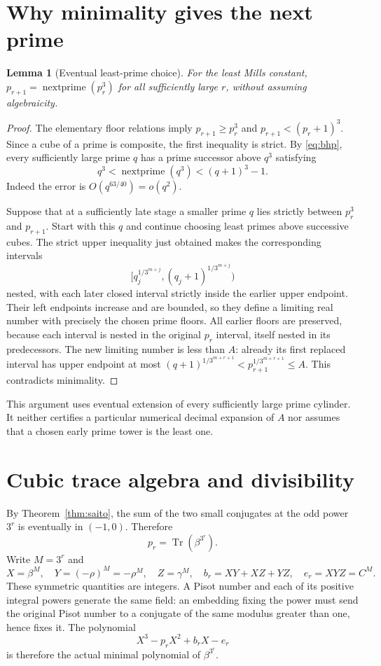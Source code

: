 \documentclass[11pt,a4paper]{article}
\newtheorem{lemma}[theorem]{Lemma}
\theoremstyle{definition}\newtheorem{definition}[theorem]{Definition}
\theoremstyle{remark}\newtheorem{remark}[theorem]{Remark}
\DeclareMathOperator{\Tr}{Tr}\DeclareMathOperator{\Norm}{N}\DeclareMathOperator{\trdeg}{trdeg}\DeclareMathOperator{\ord}{ord}\DeclareMathOperator{\lcm}{lcm}
\begin{document}
\section{Why minimality gives the next prime}
\begin{lemma}[Eventual least-prime choice]\label{lem:least}
For the least Mills constant, $p_{r+1}=\operatorname{nextprime}(p_r^3)$ for all sufficiently large $r$, without assuming algebraicity.
\end{lemma}
\begin{proof}
The elementary floor relations imply $p_{r+1}\ge p_r^3$ and $p_{r+1}<(p_r+1)^3$. Since a cube of a prime is composite, the first inequality is strict. By \eqref{eq:bhp}, every sufficiently large prime $q$ has a prime successor above $q^3$ satisfying
\[
 q^3<\operatorname{nextprime}(q^3)<(q+1)^3-1.
\]
Indeed the error is $O(q^{63/40})=o(q^2)$.

Suppose that at a sufficiently late stage a smaller prime $q$ lies strictly between $p_r^3$ and $p_{r+1}$. Start with this $q$ and continue choosing least primes above successive cubes. The strict upper inequality just obtained makes the corresponding intervals
\[
 [q_j^{1/3^{m+j}},(q_j+1)^{1/3^{m+j}})
\]
nested, with each later closed interval strictly inside the earlier upper endpoint. Their left endpoints increase and are bounded, so they define a limiting real number with precisely the chosen prime floors. All earlier floors are preserved, because each interval is nested in the original $p_r$ interval, itself nested in its predecessors. The new limiting number is less than $A$: already its first replaced interval has upper endpoint at most $(q+1)^{1/3^{m+r+1}}<p_{r+1}^{1/3^{m+r+1}}\le A$. This contradicts minimality.
\end{proof}
This argument uses eventual extension of every sufficiently large prime cylinder. It neither certifies a particular numerical decimal expansion of $A$ nor assumes that a chosen early prime tower is the least one.

\section{Cubic trace algebra and divisibility}
By Theorem~\ref{thm:saito}, the sum of the two small conjugates at the odd power $3^r$ is eventually in $(-1,0)$. Therefore
\[
 p_r=\Tr(\beta^{3^r}).
\]
Write $M=3^r$ and
\[
 X=\beta^M,\quad Y=(-\rho)^M=-\rho^M,\quad Z=\gamma^M,
 \quad b_r=XY+XZ+YZ,\quad e_r=XYZ=C^M.
\]
These symmetric quantities are integers. A Pisot number and each of its positive integral powers generate the same field: an embedding fixing the power must send the original Pisot number to a conjugate of the same modulus greater than one, hence fixes it. The polynomial
\begin{equation}\label{eq:poweredpoly}
 X^3-p_rX^2+b_rX-e_r
\end{equation}
is therefore the actual minimal polynomial of $\beta^{3^r}$.
\end{document}
